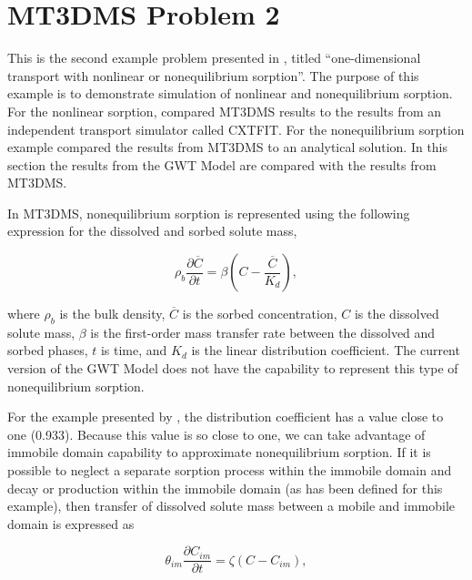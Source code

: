 \section{MT3DMS Problem 2}

This is the second example problem presented in \cite{zheng1999mt3dms}, titled ``one-dimensional transport with nonlinear or nonequilibrium sorption''.  The purpose of this example is to demonstrate simulation of nonlinear and nonequilibrium sorption.   For the nonlinear sorption, \cite{zheng1999mt3dms} compared MT3DMS results to the results from an independent transport simulator called CXTFIT.  For the nonequilibrium sorption example \cite{zheng1999mt3dms} compared the results from MT3DMS to an analytical solution.  In this section the results from the \mf GWT Model are compared with the results from MT3DMS.

In MT3DMS, nonequilibrium sorption is represented using the following expression for the dissolved and sorbed solute mass,

\begin{equation}
	\rho_b \frac{\partial \overline{C}}{\partial t} = \beta \left ( C - \frac{\overline{C}}{K_d} \right ),
	\label{eq:nonequilbrium}
\end{equation}

\noindent where $\rho_b$ is the bulk density, $\overline{C}$ is the sorbed concentration, $C$ is the dissolved solute mass, $\beta$ is the first-order mass transfer rate between the dissolved and sorbed phases, $t$ is time, and $K_d$ is the linear distribution coefficient.  The current version of the \mf GWT Model does not have the capability to represent this type of nonequilibrium sorption.  

For the example presented by \cite{zheng1999mt3dms}, the distribution coefficient has a value close to one (0.933). Because this value is so close to one, we can take advantage of immobile domain capability to approximate nonequilibrium sorption.  If it is possible to neglect a separate sorption process within the immobile domain and decay or production within the immobile domain (as has been defined for this example), then transfer of dissolved solute mass between a mobile and immobile domain is expressed as

\begin{equation}
	\theta_{im} \frac{\partial C_{im}}{\partial t} = \zeta \left ( C - C_{im} \right ),
	\label{eq:nonequilbrium}
\end{equation}

